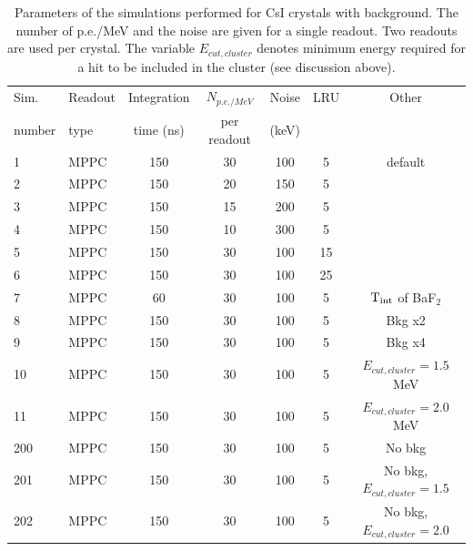 \begin{table}[htb]
\begin{center}
\begin{tabular}{|l|l|c|c|c|c|c|}\hline
Sim.   & Readout      & Integration & $N_{p.e./ MeV}$ & Noise & LRU & Other \\ 
number & type         & time (ns)   &  per readout    & (keV) &     & \\ \hline
1     & MPPC          & 150         &  30             & 100   &  5  &  default \\
2     & MPPC          & 150         &  20             & 150   &  5  &       \\
3     & MPPC          & 150         &  15             & 200   &  5  &       \\
4     & MPPC          & 150         &  10             & 300   &  5  &       \\
5     & MPPC          & 150         &  30             & 100   & 15  &       \\
6     & MPPC          & 150         &  30             & 100   & 25  &       \\
7     & MPPC          &  60         &  30             & 100   &  5  & $\rm T_{int}$ of BaF$_2$ \\
8     & MPPC          & 150         &  30             & 100   &  5  & Bkg x2 \\
9     & MPPC          & 150         &  30             & 100   &  5  & Bkg x4 \\ 
10    & MPPC          & 150         &  30             & 100   &  5  & $E_{cut,cluster} = 1.5$ MeV \\ 
11    & MPPC          & 150         &  30             & 100   &  5  & $E_{cut,cluster} = 2.0$ MeV \\ \hline
200   & MPPC          & 150         &  30             & 100   &  5  & No bkg \\ 
201   & MPPC          & 150         &  30             & 100   &  5  & No bkg, $E_{cut,cluster} = 1.5$ \\ 
202   & MPPC          & 150         &  30             & 100   &  5  & No bkg, $E_{cut,cluster} = 2.0$ \\ \hline
\end{tabular}
\end{center}
\caption{Parameters of the simulations performed for CsI crystals with background. The number of p.e./MeV and the 
noise are given for a single readout. Two readouts are used per crystal. The variable $E_{cut,cluster}$ denotes 
minimum energy required for a hit to be included in the cluster (see discussion above).}
\label{sim:tab::Csi}
\end{table}   


